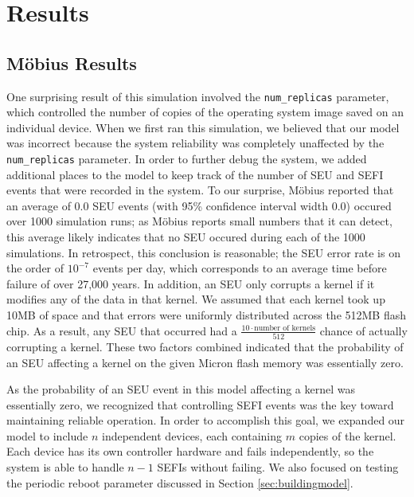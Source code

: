 \section{Results}\label{sec:results}

\subsection{M\"obius Results}\label{sec:mobiusresults}

One surprising result of this simulation involved the \texttt{num\_replicas} parameter, which controlled the number of copies of the operating system image saved on an individual device.  When we first ran this simulation, we believed that our model was incorrect because the system reliability was completely unaffected by the \texttt{num\_replicas} parameter.  In order to further debug the system, we added additional places to the model to keep track of the number of SEU and SEFI events that were recorded in the system.  To our surprise, M\"obius reported that an average of 0.0 SEU events (with 95\% confidence interval width 0.0) occured over 1000 simulation runs; as M\"obius reports small numbers that it can detect, this average likely indicates that no SEU occured during each of the 1000 simulations.  In retrospect, this conclusion is reasonable; the SEU error rate is on the order of $10^{-7}$ events per day, which corresponds to an average time before failure of over 27,000 years.  In addition, an SEU only corrupts a kernel if it modifies any of the data in that kernel.  We assumed that each kernel took up 10MB of space and that errors were uniformly distributed across the 512MB flash chip.  As a result, any SEU that occurred had a $\frac{10\cdot\textrm{number of kernels}}{512}$ chance of actually corrupting a kernel.  These two factors combined indicated that the probability of an SEU affecting a kernel on the given Micron flash memory was essentially zero.

As the probability of an SEU event in this model affecting a kernel was essentially zero, we recognized that controlling SEFI events was the key toward maintaining reliable operation.  In order to accomplish this goal, we expanded our model to include $n$ independent devices, each containing $m$ copies of the kernel.  Each device has its own controller hardware and fails independently, so the system is able to handle $n-1$ SEFIs without failing.  We also focused on testing the periodic reboot parameter discussed in Section \ref{sec:buildingmodel}.

